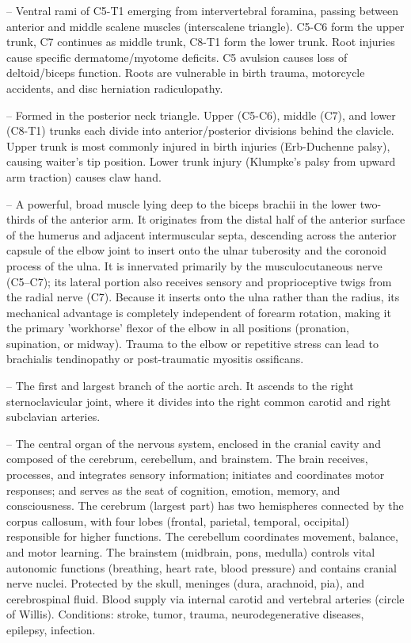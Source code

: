 -- Ventral rami of C5-T1 emerging from intervertebral foramina, passing between anterior and middle scalene muscles (interscalene triangle). C5-C6 form the upper trunk, C7 continues as middle trunk, C8-T1 form the lower trunk. Root injuries cause specific dermatome/myotome deficits. C5 avulsion causes loss of deltoid/biceps function. Roots are vulnerable in birth trauma, motorcycle accidents, and disc herniation radiculopathy.

-- Formed in the posterior neck triangle. Upper (C5-C6), middle (C7), and lower (C8-T1) trunks each divide into anterior/posterior divisions behind the clavicle. Upper trunk is most commonly injured in birth injuries (Erb-Duchenne palsy), causing waiter's tip position. Lower trunk injury (Klumpke's palsy from upward arm traction) causes claw hand.

-- A powerful, broad muscle lying deep to the biceps brachii in the lower two-thirds of the anterior arm. It originates from the distal half of the anterior surface of the humerus and adjacent intermuscular septa, descending across the anterior capsule of the elbow joint to insert onto the ulnar tuberosity and the coronoid process of the ulna. It is innervated primarily by the musculocutaneous nerve (C5--C7); its lateral portion also receives sensory and proprioceptive twigs from the radial nerve (C7). Because it inserts onto the ulna rather than the radius, its mechanical advantage is completely independent of forearm rotation, making it the primary 'workhorse' flexor of the elbow in all positions (pronation, supination, or midway). Trauma to the elbow or repetitive stress can lead to brachialis tendinopathy or post-traumatic myositis ossificans.

-- The first and largest branch of the aortic arch. It ascends to the right sternoclavicular joint, where it divides into the right common carotid and right subclavian arteries.

-- The central organ of the nervous system, enclosed in the cranial cavity and composed of the cerebrum, cerebellum, and brainstem. The brain receives, processes, and integrates sensory information; initiates and coordinates motor responses; and serves as the seat of cognition, emotion, memory, and consciousness. The cerebrum (largest part) has two hemispheres connected by the corpus callosum, with four lobes (frontal, parietal, temporal, occipital) responsible for higher functions. The cerebellum coordinates movement, balance, and motor learning. The brainstem (midbrain, pons, medulla) controls vital autonomic functions (breathing, heart rate, blood pressure) and contains cranial nerve nuclei. Protected by the skull, meninges (dura, arachnoid, pia), and cerebrospinal fluid. Blood supply via internal carotid and vertebral arteries (circle of Willis). Conditions: stroke, tumor, trauma, neurodegenerative diseases, epilepsy, infection.

